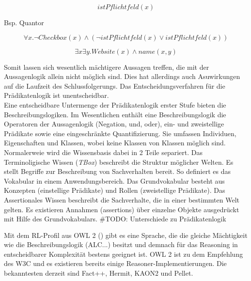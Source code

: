 \documentclass[runningheads,a4paper]{llncs}
\begin{document}
\begin{equation}
istPflichtfeld(x)
\end{equation}

Bsp. Quantor

\begin{equation}
\forall x. \neg Checkbox(x) \land (\neg istPflichtfeld(x) \lor istPflichtfeld(x))
\end{equation}

\begin{equation}
\exists x\exists y. Website(x) \land name(x, y)
\end{equation}

Somit lassen sich wesentlich mächtigere Aussagen treffen, die mit der Aussagenlogik allein nicht möglich sind.
Dies hat allerdings auch Asuwirkungen auf die Laufzeit des Schlussfolgerungs.
Das Entscheidungsverfahren für die Prädikatenlogik ist unentscheidbar. 
\\

Eine entscheidbare Untermenge der Prädikatenlogik erster Stufe bieten die Beschreibungslogiken.
Im Wesentlichen enthält eine Beschreibungslogik die Operatoren der Aussagenlogik (Negation, und, oder), ein- und zweistellige Prädikate sowie eine eingeschränkte Quantifizierung.
Sie umfassen Individuen, Eigenschaften und Klassen, wobei keine Klassen von Klassen möglich sind.
Normalerweie wird die Wissensbasis dabei in 2 Teile separiert. 
Das Terminoligische Wissen (\textit{TBox}) beschreibt die Struktur möglicher Welten. 
Es stellt Begriffe zur Beschreibung von Sachverhalten bereit. 
So definiert es das Vokabular in einem Anwendungsbereich. 
Das Grundvokabular besteht aus Konzepten (einstellige Prädikate) und Rollen (zweistellige Prädikate). 
Das Assertionales Wissen beschreibt die Sachverhalte, die in einer bestimmten Welt gelten. 
Es existieren Annahmen (assertions) über einzelne Objekte ausgedrückt mit
Hilfe des Grundvokabulars.
\#TODO: Unterschiede zu Prädikatenlogik

Mit dem RL-Profil aus OWL 2 (\cite{owl2rl}) gibt es eine Sprache, die die gleiche Mächtigkeit wie die Beschreibungslogik (ALC...) besitzt und demnach für das Reasoning in entscheidbarer Komplexität bestens geeignet ist. 
OWL 2 ist zu dem Empfehlung des W3C und es existieren bereits einige Reasoner-Implementierungen. 
Die bekanntesten derzeit sind Fact++, Hermit, KAON2 und Pellet.
\end{document}

